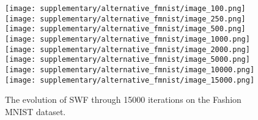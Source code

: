 \begin{figure}
\centering
\texttt{[image: supplementary/alternative\_fmnist/image\_100.png]}
\texttt{[image: supplementary/alternative\_fmnist/image\_250.png]}
\texttt{[image: supplementary/alternative\_fmnist/image\_500.png]}
\texttt{[image: supplementary/alternative\_fmnist/image\_1000.png]}\\
\texttt{[image: supplementary/alternative\_fmnist/image\_2000.png]}
\texttt{[image: supplementary/alternative\_fmnist/image\_5000.png]}
\texttt{[image: supplementary/alternative\_fmnist/image\_10000.png]}
\texttt{[image: supplementary/alternative\_fmnist/image\_15000.png]}
\caption{The evolution of SWF through 15000 iterations on the Fashion MNIST dataset.}
\label{fig:suppfmnist}
\end{figure}










